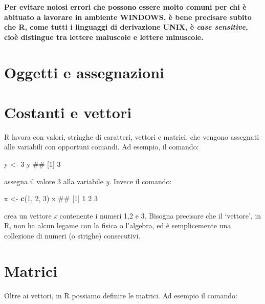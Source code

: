 \documentclass[a4paper,12pt,oneside]{book}
\newenvironment{Shaded}{\begin{snugshade}}{\end{snugshade}}
\newcommand{\KeywordTok}[1]{\textcolor[rgb]{0.13,0.29,0.53}{\textbf{#1}}}
\newcommand{\DecValTok}[1]{\textcolor[rgb]{0.00,0.00,0.81}{#1}}
\newcommand{\StringTok}[1]{\textcolor[rgb]{0.31,0.60,0.02}{#1}}
\newcommand{\NormalTok}[1]{#1}
\theoremstyle{definition}
\theoremstyle{definition}
\theoremstyle{definition}
\theoremstyle{remark}
\begin{document}
\textbf{Per evitare noiosi errori che possono essere molto comuni per
chi è abituato a lavorare in ambiente WINDOWS, è bene precisare subito
che R, come tutti i linguaggi di derivazione UNIX, è \emph{case
sensitive}, cioè distingue tra lettere maiuscole e lettere minuscole.}

\section*{Oggetti e assegnazioni}\label{oggetti-e-assegnazioni}

\section*{Costanti e vettori}\label{costanti-e-vettori}

R lavora con valori, stringhe di caratteri, vettori e matrici, che
vengono assegnati alle variabili con opportuni comandi. Ad esempio, il
comando:

\begin{Shaded}
\begin{Highlighting}[]
\NormalTok{y  <-}\StringTok{  }\DecValTok{3}
\NormalTok{y}
\NormalTok{## [1] 3}
\end{Highlighting}
\end{Shaded}

assegna il valore 3 alla variabile \emph{y}. Invece il comando:

\begin{Shaded}
\begin{Highlighting}[]
\NormalTok{x  <-}\StringTok{  }\KeywordTok{c}\NormalTok{(}\DecValTok{1}\NormalTok{, }\DecValTok{2}\NormalTok{, }\DecValTok{3}\NormalTok{)}
\NormalTok{x}
\NormalTok{## [1] 1 2 3}
\end{Highlighting}
\end{Shaded}

crea un vettore \emph{x} contenente i numeri 1,2 e 3. Bisogna precisare
che il `vettore', in R, non ha alcun legame con la fisica o l'algebra,
ed è semplicemente una collezione di numeri (o strighe) consecutivi.

\section*{Matrici}\label{matrici}

Oltre ai vettori, in R possiamo definire le matrici. Ad esempio il
comando:
\end{document}
